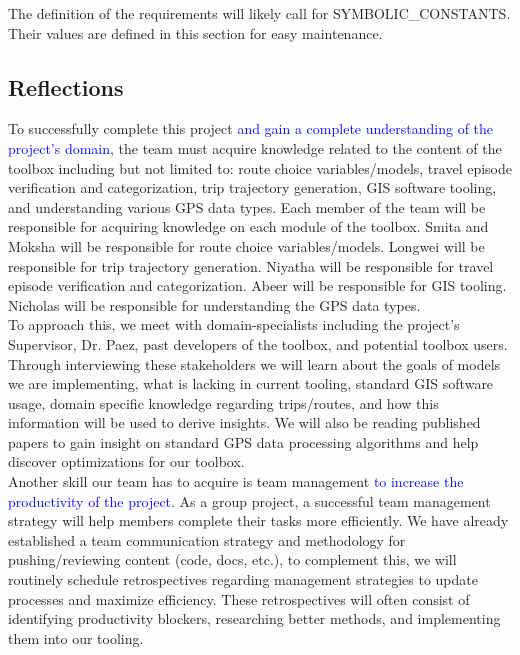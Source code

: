 \documentclass[12pt, titlepage]{article}
\begin{document}
The definition of the requirements will likely call for SYMBOLIC\_CONSTANTS.
Their values are defined in this section for easy maintenance.

\subsection{Reflections}

To successfully complete this project \textcolor{blue}{and gain a complete understanding of the project's domain}, the team must acquire knowledge related to the content of the toolbox including but not limited to: route choice variables/models, travel episode verification and categorization, trip trajectory generation, GIS software tooling, and understanding various GPS data types. Each member of the team will be responsible for acquiring knowledge on each module of the toolbox. Smita and Moksha will be responsible for route choice variables/models. Longwei will be responsible for trip trajectory generation. Niyatha will be responsible for travel episode verification and categorization. Abeer will be responsible for GIS tooling. Nicholas will be responsible for understanding the GPS data types.\\

\noident To approach this, we meet with domain-specialists including the project's Supervisor, Dr. Paez, past developers of the toolbox, and potential toolbox users. Through interviewing these stakeholders we will learn about the goals of models we are implementing, what is lacking in current tooling, standard GIS software usage, domain specific knowledge regarding trips/routes, and how this information will be used to derive insights. We will also be reading published papers to gain insight on standard GPS data processing algorithms and help discover optimizations for our toolbox.\\

\noindent Another skill our team has to acquire is team management \textcolor{blue}{to increase the productivity of the project}. As a group project, a successful team management strategy will help members complete their tasks more efficiently. We have already established a team communication strategy and methodology for pushing/reviewing content (code, docs, etc.), to complement this, we will routinely schedule retrospectives regarding management strategies to update processes and maximize efficiency. These retrospectives will often consist of identifying productivity blockers, researching better methods, and implementing them into our tooling. \\
\end{document}
